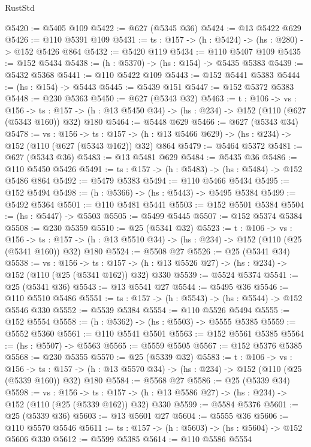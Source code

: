 \begin{lexlean}{RustStd}
\begin{coremodule}
@5420 := @5405 @109
@5422 := @627 (@5345 @36)
@5424 := @13 @5422 @629
@5426 := @110 @5391 @109
@5431 := {ts : @157} -> (h : @5424) -> (hs : @280) -> @152 @5426 @864
@5432 := @5420 @119
@5434 := @110 @5407 @109
@5435 := @152 @5434
@5438 := (h : @5370) -> (hs : @154) -> @5435 @5383
@5439 := @5432 @5368
@5441 := @110 @5422 @109
@5443 := @152 @5441 @5383
@5444 := (hs : @154) -> @5443
@5445 := @5439 @151
@5447 := @152 @5372 @5383
@5448 := @230 @5363
@5450 := @627 (@5343 @32)
@5463 := {t : @106} ->
  {vs : @156} ->
  {ts : @157} -> (h : @13 @5450 @34) -> (hs : @234) -> @152 (@110 (@627 (@5343 @160)) @32) @180
@5464 := @5448 @629
@5466 := @627 (@5343 @34)
@5478 := {vs : @156} ->
  {ts : @157} -> (h : @13 @5466 @629) -> (hs : @234) -> @152 (@110 (@627 (@5343 @162)) @32) @864
@5479 := @5464 @5372
@5481 := @627 (@5343 @36)
@5483 := @13 @5481 @629
@5484 := @5435 @36
@5486 := @110 @5450 @5426
@5491 := {ts : @157} -> (h : @5483) -> (hs : @5484) -> @152 @5486 @864
@5492 := @5479 @5383
@5494 := @110 @5466 @5434
@5495 := @152 @5494
@5498 := (h : @5366) -> (hs : @5443) -> @5495 @5384
@5499 := @5492 @5364
@5501 := @110 @5481 @5441
@5503 := @152 @5501 @5384
@5504 := (hs : @5447) -> @5503
@5505 := @5499 @5445
@5507 := @152 @5374 @5384
@5508 := @230 @5359
@5510 := @25 (@5341 @32)
@5523 := {t : @106} ->
  {vs : @156} ->
  {ts : @157} -> (h : @13 @5510 @34) -> (hs : @234) -> @152 (@110 (@25 (@5341 @160)) @32) @180
@5524 := @5508 @27
@5526 := @25 (@5341 @34)
@5538 := {vs : @156} ->
  {ts : @157} -> (h : @13 @5526 @27) -> (hs : @234) -> @152 (@110 (@25 (@5341 @162)) @32) @330
@5539 := @5524 @5374
@5541 := @25 (@5341 @36)
@5543 := @13 @5541 @27
@5544 := @5495 @36
@5546 := @110 @5510 @5486
@5551 := {ts : @157} -> (h : @5543) -> (hs : @5544) -> @152 @5546 @330
@5552 := @5539 @5384
@5554 := @110 @5526 @5494
@5555 := @152 @5554
@5558 := (h : @5362) -> (hs : @5503) -> @5555 @5385
@5559 := @5552 @5360
@5561 := @110 @5541 @5501
@5563 := @152 @5561 @5385
@5564 := (hs : @5507) -> @5563
@5565 := @5559 @5505
@5567 := @152 @5376 @5385
@5568 := @230 @5355
@5570 := @25 (@5339 @32)
@5583 := {t : @106} ->
  {vs : @156} ->
  {ts : @157} -> (h : @13 @5570 @34) -> (hs : @234) -> @152 (@110 (@25 (@5339 @160)) @32) @180
@5584 := @5568 @27
@5586 := @25 (@5339 @34)
@5598 := {vs : @156} ->
  {ts : @157} -> (h : @13 @5586 @27) -> (hs : @234) -> @152 (@110 (@25 (@5339 @162)) @32) @330
@5599 := @5584 @5376
@5601 := @25 (@5339 @36)
@5603 := @13 @5601 @27
@5604 := @5555 @36
@5606 := @110 @5570 @5546
@5611 := {ts : @157} -> (h : @5603) -> (hs : @5604) -> @152 @5606 @330
@5612 := @5599 @5385
@5614 := @110 @5586 @5554

\end{coremodule}
\end{lexlean}

